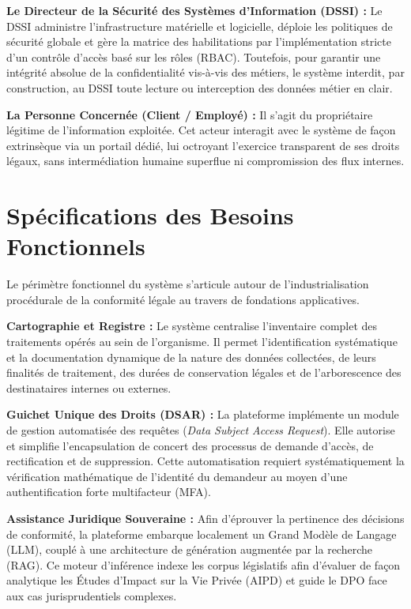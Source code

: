 \textbf{Le Directeur de la Sécurité des Systèmes d'Information (DSSI) :} Le DSSI administre l'infrastructure matérielle et logicielle, déploie les politiques de sécurité globale et gère la matrice des habilitations par l'implémentation stricte d'un contrôle d'accès basé sur les rôles (RBAC). Toutefois, pour garantir une intégrité absolue de la confidentialité vis-à-vis des métiers, le système interdit, par construction, au DSSI toute lecture ou interception des données métier en clair.

\textbf{La Personne Concernée (Client / Employé) :} Il s'agit du propriétaire légitime de l'information exploitée. Cet acteur interagit avec le système de façon extrinsèque via un portail dédié, lui octroyant l'exercice transparent de ses droits légaux, sans intermédiation humaine superflue ni compromission des flux internes.

\section{Spécifications des Besoins Fonctionnels}
Le périmètre fonctionnel du système s'articule autour de l'industrialisation procédurale de la conformité légale au travers de fondations applicatives.

\textbf{Cartographie et Registre :} Le système centralise l'inventaire complet des traitements opérés au sein de l'organisme. Il permet l'identification systématique et la documentation dynamique de la nature des données collectées, de leurs finalités de traitement, des durées de conservation légales et de l'arborescence des destinataires internes ou externes.

\textbf{Guichet Unique des Droits (DSAR) :} La plateforme implémente un module de gestion automatisée des requêtes (\textit{Data Subject Access Request}). Elle autorise et simplifie l'encapsulation de concert des processus de demande d'accès, de rectification et de suppression. Cette automatisation requiert systématiquement la vérification mathématique de l'identité du demandeur au moyen d'une authentification forte multifacteur (MFA).

\textbf{Assistance Juridique Souveraine :} Afin d'éprouver la pertinence des décisions de conformité, la plateforme embarque localement un Grand Modèle de Langage (LLM), couplé à une architecture de génération augmentée par la recherche (RAG). Ce moteur d'inférence indexe les corpus législatifs afin d'évaluer de façon analytique les Études d’Impact sur la Vie Privée (AIPD) et guide le DPO face aux cas jurisprudentiels complexes. 

